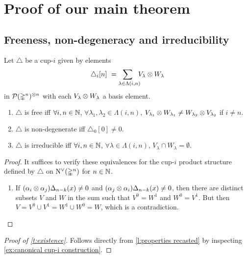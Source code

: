 
\section{Proof of our main theorem} \label{sec: proof}

\subsection{Freeness, non-degeneracy and irreducibility}

\begin{lemma} \label{l:properties recasted}
	Let $\triangle$ be a cup-$i$ given by elements
	\[
	\triangle_i [n] \ =
	\sum_{\lambda \in \Lambda(i,n) \kern-5pt} V_\lambda \otimes W_\lambda
	\]
	in $\mathcal{P}(\mathbb{\Delta}^n)^{\otimes n}$ with each $V_\lambda \otimes W_\lambda$ a basis element.
	\begin{enumerate}
		\item $\triangle$ is free iff \kern 1pt
		$\forall i,n \in \mathbb{N}$, $\forall \lambda_1, \lambda_2 \in \Lambda(i,n)$, $V_{\lambda_1} \otimes W_{\lambda_1} \neq W_{\lambda_2} \otimes V_{\lambda_2}$ if $i \neq n$.
		\item $\triangle$ is non-degenerate iff
		$\triangle_0 [0] \neq 0$.
		\item $\triangle$ is irreducible iff \kern 1pt
		$\forall i,n \in \mathbb{N}$, $\forall \lambda \in \Lambda(i,n)$, $V_\lambda \cap W_\lambda = \emptyset$.
	\end{enumerate}
\end{lemma}

\begin{proof}
	It suffices to verify these equivalences for the cup-$i$ product structure defined by $\triangle$ on $\operatorname{N^{\vee}}(\mathbb{\Delta}^n)$ for $n \in \mathbb{N}$.
	\begin{enumerate}
		\item If $(\alpha_i \otimes \alpha_j)\Delta_{n-k}(x) \neq 0$ and $(\alpha_j \otimes \alpha_i)\Delta_{n-k}(x) \neq 0$, then there are distinct subsets $V$ and $W$ in the sum such that $V^0 = W^1$ and $W^0 = V^1$.
		But then $V = V^0 \cup V^1 = W^1 \cup W^0 = W$, which is a contradiction.
	\end{enumerate}
\end{proof}

\begin{proof} [Proof of \cref{t:existence}]
	Follows directly from \cref{l:properties recasted} by inspecting \cref{ex:canonical cup-i construction}.
\end{proof}

